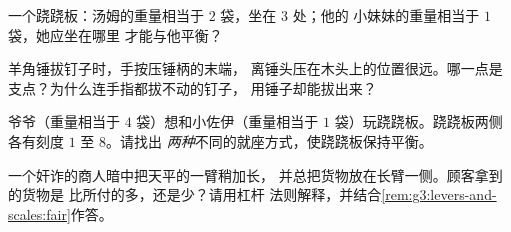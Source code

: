 \begin{exercise}[$\star$]\label{exo:g3:levers-and-scales:8}
一个跷跷板：汤姆的重量相当于 $2$ 袋，坐在 $3$ 处；他的
小妹妹的重量相当于 $1$ 袋，她应坐在哪里
才能与他平衡？
\end{exercise}

\begin{exercise}[$\star$]\label{exo:g3:levers-and-scales:9}
羊角锤拔钉子时，手按压锤柄的末端，
离锤头压在木头上的位置很远。哪一点是
支点？为什么连手指都拔不动的钉子，
用锤子却能拔出来？
\end{exercise}

\begin{exercise}[$\star\star$]\label{exo:g3:levers-and-scales:10}
爷爷（重量相当于 $4$ 袋）想和小佐伊（重量相当于
$1$ 袋）玩跷跷板。跷跷板两侧各有刻度 $1$ 至 $8$。请找出
\emph{两种}不同的就座方式，使跷跷板保持平衡。
\end{exercise}

\begin{exercise}[$\star\star$]\label{exo:g3:levers-and-scales:11}
一个奸诈的商人暗中把天平的一臂稍加长，
并总把货物放在长臂一侧。顾客拿到的货物是
比所付的多，还是少？请用杠杆
法则解释，并结合\cref{rem:g3:levers-and-scales:fair}作答。
\end{exercise}
